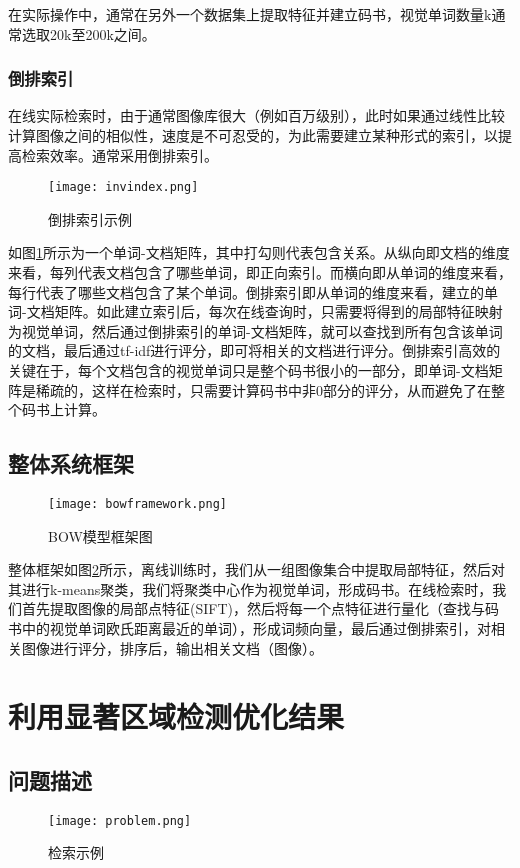 在实际操作中，通常在另外一个数据集上提取特征并建立码书，视觉单词数量k通常选取20k至200k之间。

\subsubsection{倒排索引}
在线实际检索时，由于通常图像库很大（例如百万级别），此时如果通过线性比较计算图像之间的相似性，速度是不可忍受的，为此需要建立某种形式的索引，以提高检索效率。通常采用倒排索引。
\begin{figure}[h]
\centering
\texttt{[image: invindex.png]}
\caption{倒排索引示例}\label{fig:invindex}
\end{figure}
如图\ref{fig:invindex}所示为一个单词-文档矩阵，其中打勾则代表包含关系。从纵向即文档的维度来看，每列代表文档包含了哪些单词，即正向索引。而横向即从单词的维度来看，每行代表了哪些文档包含了某个单词。倒排索引即从单词的维度来看，建立的单词-文档矩阵。如此建立索引后，每次在线查询时，只需要将得到的局部特征映射为视觉单词，然后通过倒排索引的单词-文档矩阵，就可以查找到所有包含该单词的文档，最后通过tf-idf进行评分，即可将相关的文档进行评分。倒排索引高效的关键在于，每个文档包含的视觉单词只是整个码书很小的一部分，即单词-文档矩阵是稀疏的，这样在检索时，只需要计算码书中非0部分的评分，从而避免了在整个码书上计算。

\subsection{整体系统框架}
\begin{figure}[h]
\centering
\texttt{[image: bowframework.png]}
\caption{BOW模型框架图}\label{fig:bowframework}
\end{figure}
整体框架如图\ref{fig:bowframework}所示，离线训练时，我们从一组图像集合中提取局部特征，然后对其进行k-means聚类，我们将聚类中心作为视觉单词，形成码书。在线检索时，我们首先提取图像的局部点特征(SIFT)，然后将每一个点特征进行量化（查找与码书中的视觉单词欧氏距离最近的单词），形成词频向量，最后通过倒排索引，对相关图像进行评分，排序后，输出相关文档（图像）。

\section{利用显著区域检测优化结果}
\subsection{问题描述}
\begin{figure}[h]
\centering
\texttt{[image: problem.png]}
\caption{检索示例}\label{fig:problem}
\end{figure}


